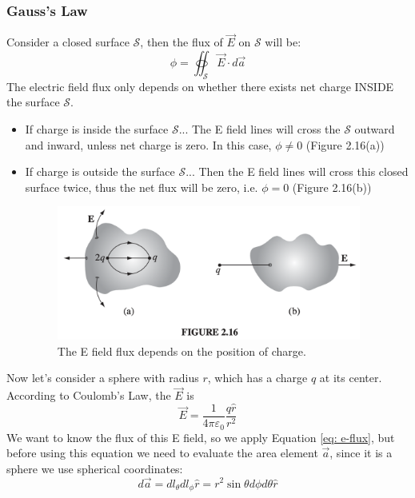 \documentclass[12pt,a4paper,twoside]{article}
\begin{document}
\subsubsection{Gauss's Law}
    Consider a closed surface $\mathcal{S}$, then the flux of $\overrightarrow{E}$ on $\mathcal{S}$ will be:
    \begin{equation}
        \phi = \oiint_{\mathcal{S}}\overrightarrow{E}\cdot d\overrightarrow{a}
        \label{eq: e-flux}
    \end{equation}
    The electric field flux only depends on whether there exists net charge INSIDE the surface $\mathcal{S}$.
    \begin{itemize}
        \item If charge is inside the surface $\mathcal{S}$...
            \subitem The E field lines will cross the $\mathcal{S}$ outward and inward, unless net charge is zero. In this case, $\phi\neq 0$ (Figure 2.16(a))
        \item If charge is outside the surface $\mathcal{S}$...
            \subitem Then the E field lines will cross this closed surface twice, thus the net flux will be zero, i.e. $\phi=0$ (Figure 2.16(b))
        \begin{figure}[ht]
            \centering
            \includegraphics[width=10cm]{250-Revision/Fig-2-16.png}
            \caption{The E field flux depends on the position of charge.}
            \label{fig:2-16}
        \end{figure}
    \end{itemize}
    
    Now let's consider a sphere with radius $r$, which has a charge $q$ at its center. According to Coulomb's Law, the $\overrightarrow{E}$ is
    \[\overrightarrow{E} = \frac{1}{4\pi\varepsilon_0}\frac{q\hat{r}}{r^2}\]
    We want to know the flux of this E field, so we apply Equation \ref{eq: e-flux}, but before using this equation we need to evaluate the area element $\overrightarrow{a}$, since it is a sphere we use spherical coordinates:
    \[d\overrightarrow{a}=dl_\theta dl_\phi\hat{r}=r^2\sin\theta d\phi d\theta\hat{r}\]
    
\end{document}
